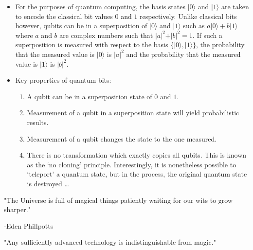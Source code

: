 \documentclass{article}
\def\pagedone{\newpage}
\def\ket#1{|{#1}\rangle}
\begin{document}
\pagedone
\begin{itemize}

\item For the purposes of quantum computing, the basis states $\ket 0$ and $\ket 1$ 
are taken to encode the classical bit values
$0$ and $1$ respectively. 
Unlike classical bits however, qubits can be in a superposition of
$\ket 0$ and $\ket 1$ such as $a\ket 0 + b\ket 1$
where $a$ and $b$ are complex numbers such that 
$\vert a\vert^2 + \vert b\vert^2 = 1$. If such a superposition is measured with
respect to the basis $\{\ket 0,\ket 1\}$, the probability that the 
measured value is $\ket 0$ is $\vert a\vert ^2$ and the probability that the
measured value is $\ket 1$ is  $\vert b\vert ^2$.

\end{itemize}



\pagedone
\begin{itemize}

\item Key properties of quantum bits:
 \begin{enumerate}
 \item A qubit can be in a superposition state of $0$ and $1$.  
 \item Measurement of a qubit in a superposition state will yield
 probabilistic results.
 \item Measurement of a qubit changes the state to the one measured.
 \item There is no transformation which exactly copies all qubits.  This is known as the `no cloning' principle.  Interestingly, it is nonetheless possible to `teleport' a quantum state, but in the process, the original quantum state is destroyed \ldots
 \end{enumerate}

\end{itemize}

\pagedone


"The Universe is full of magical things patiently waiting for our wits to
grow sharper."

-Eden Phillpotts

"Any sufficiently advanced technology is indistinguishable from magic."
\end{document}
